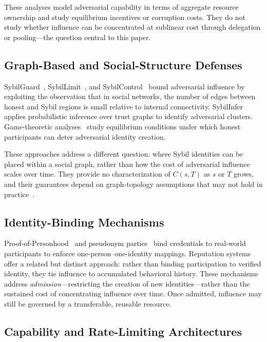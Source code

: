 \documentclass[10pt,journal,compsoc]{IEEEtran}
\theoremstyle{remark}
\begin{document}
	These analyses model adversarial capability in terms of
	aggregate resource ownership and study equilibrium
	incentives or corruption costs.
	They do not study whether influence can be concentrated
	at sublinear cost through delegation or pooling---the
	question central to this paper.
	
	\subsection{Graph-Based and Social-Structure Defenses}
	\label{ssec:rw_graph}
	
	SybilGuard~\cite{yu2006sybilguard},
	SybilLimit~\cite{yu2008sybillimit}, and
	SybilControl~\cite{li2017sybilcontrol} bound adversarial
	influence by exploiting the observation that in social
	networks, the number of edges between honest and Sybil
	regions is small relative to internal connectivity.
	SybilInfer~\cite{danezis2009sybilinfer} applies
	probabilistic inference over trust graphs to identify
	adversarial clusters.
	Game-theoretic analyses~\cite{lesniewski2020analysis}
	study equilibrium conditions under which honest participants
	can deter adversarial identity creation.
	
	These approaches address a different question: where
	Sybil identities can be placed within a social graph,
	rather than how the cost of adversarial influence scales
	over time.
	They provide no characterization of $C(s,T)$ as $s$
	or $T$ grows, and their guarantees depend on
	graph-topology assumptions that may not hold in
	practice~\cite{wang2019attack}.
	
	\subsection{Identity-Binding Mechanisms}
	\label{ssec:rw_identity}
	
	Proof-of-Personhood~\cite{borge2017pop} and pseudonym
	parties~\cite{ford2020pseudonym} bind credentials to
	real-world participants to enforce one-person--one-identity
	mappings.
	Reputation systems~\cite{resnick2000reputation} offer a
	related but distinct approach: rather than binding
	participation to verified identity, they tie influence
	to accumulated behavioral history.
	These mechanisms address \emph{admission}---restricting
	the creation of new identities---rather than the sustained
	cost of concentrating influence over time.
	Once admitted, influence may still be governed by a
	transferable, reusable resource.
	
	\subsection{Capability and Rate-Limiting Architectures}
	\label{ssec:rw_capability}
	
\end{document}
